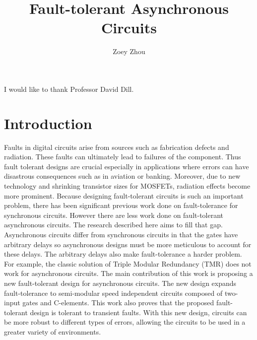 \documentclass[12pt]{report}
\title{Fault-tolerant Asynchronous Circuits}
\author{Zoey Zhou}
\begin{document}
\beforepreface


\newpage

        I would like to thank Professor David Dill. 

    \afterpreface

\chapter{Introduction}

Faults in digital circuits arise from sources such as fabrication defects and radiation.  These faults can ultimately lead to failures of the component.  Thus fault tolerant designs are crucial especially in applications where errors can have disastrous consequences such as in aviation or banking.  Moreover, due to new technology and shrinking transistor sizes for MOSFETs, radiation effects become more prominent.  Because designing fault-tolerant circuits is such an important problem, there has been significant previous work done on fault-tolerance for synchronous circuits.  However there are less work done on fault-tolerant asynchronous circuits.  The research described here aims to fill that gap.\\

Asynchronous circuits differ from synchronous circuits in that the gates have arbitrary delays so asynchronous designs must be more meticulous to account for these delays.  The arbitrary delays also make fault-tolerance a harder problem.  For example, the classic solution of Triple Modular Redundancy (TMR) does not work for asynchronous circuits.  The main contribution of this work is proposing a new fault-tolerant design for asynchronous circuits.  The new design expands fault-tolerance to semi-modular speed independent circuits composed of two-input gates and C-elements.  This work also proves that the proposed fault-tolerant design is tolerant to transient faults.  With this new design, circuits can be more robust to different types of errors, allowing the circuits to be used in a greater variety of environments.



\end{document}
